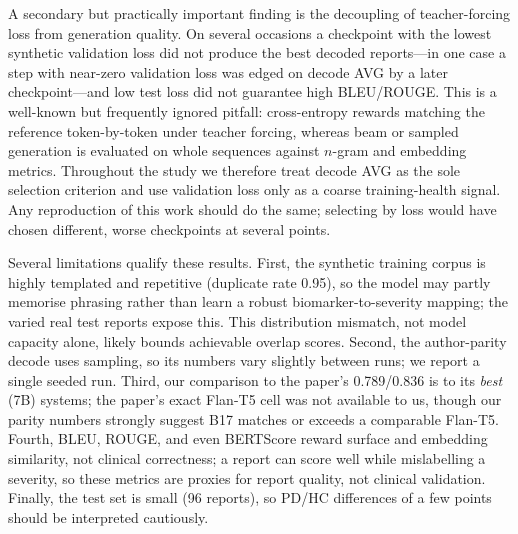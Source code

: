\documentclass[11pt,twocolumn]{article}
\begin{document}
A secondary but practically important finding is the decoupling of teacher-forcing loss from
generation quality. On several occasions a checkpoint with the lowest synthetic validation loss
did not produce the best decoded reports---in one case a step with near-zero validation loss was
edged on decode AVG by a later checkpoint---and low test loss did not guarantee high BLEU/ROUGE.
This is a well-known but frequently ignored pitfall: cross-entropy rewards matching the reference
token-by-token under teacher forcing, whereas beam or sampled generation is evaluated on whole
sequences against $n$-gram and embedding metrics. Throughout the study we therefore treat decode
AVG as the sole selection criterion and use validation loss only as a coarse training-health
signal. Any reproduction of this work should do the same; selecting by loss would have chosen
different, worse checkpoints at several points.

Several limitations qualify these results. First, the synthetic training corpus is highly
templated and repetitive (duplicate rate 0.95), so the model may partly memorise phrasing rather
than learn a robust biomarker-to-severity mapping; the varied real test reports expose this. This
distribution mismatch, not model capacity alone, likely bounds achievable overlap scores. Second,
the author-parity decode uses sampling, so its numbers vary slightly between runs; we report a
single seeded run. Third, our comparison to the paper's 0.789/0.836 is to its \emph{best} (7B)
systems; the paper's exact Flan-T5 cell was not available to us, though our parity numbers
strongly suggest B17 matches or exceeds a comparable Flan-T5. Fourth, BLEU, ROUGE, and even
BERTScore reward surface and embedding similarity, not clinical correctness; a report can score
well while mislabelling a severity, so these metrics are proxies for report quality, not clinical
validation. Finally, the test set is small (96 reports), so PD/HC differences of a few points
should be interpreted cautiously.
\end{document}
